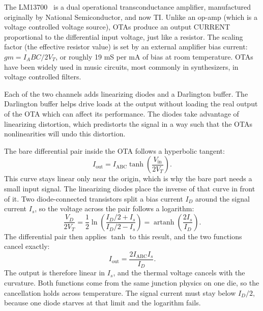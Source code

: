 \documentclass[11pt, letterpaper,titlepage]{article}
\begin{document}
\label{sssec:vcr}

The LM13700~\cite{lm13700} is a dual operational transconductance amplifier, manufactured originally by National Semiconductor, and now TI. Unlike an op-amp (which is a voltage controlled voltage source), OTAs produce an output CURRENT proportional to the differential input voltage, just like a resistor. The scaling factor (the effective resistor value) is set by an external amplifier bias current: $gm = I_ABC / 2V_T$, or roughly 19 mS per mA of bias at room temperature. OTAs have been widely used in music circuits, most commonly in synthesizers, in voltage controlled filters.

Each of the two channels adds linearizing diodes and a Darlington buffer. The Darlington buffer helps drive loads at the output without loading the real output of the OTA which can affect its performance. The
diodes take advantage of linearizing distortion, which predistorts the signal in a way such that the OTAs nonlinearities will undo this distortion.

The bare differential pair inside the OTA follows a hyperbolic tangent:
%
\begin{equation}
    I_\mathrm{out} = I_\mathrm{ABC} \tanh\!\left( \frac{V_\mathrm{in}}{2 V_T} \right) .
    \label{eq:ota-tanh}
\end{equation}
%
This curve stays linear only near the origin, which is why the bare part needs a
small input signal. The linearizing diodes place the inverse of that curve in
front of it. Two diode-connected transistors split a bias current $I_D$ around
the signal current $I_s$, so the voltage across the pair follows a logarithm:
%
\begin{equation}
    \frac{V_D}{2 V_T}
    = \frac{1}{2} \ln\!\left( \frac{I_D/2 + I_s}{I_D/2 - I_s} \right)
    = \operatorname{artanh}\!\left( \frac{2 I_s}{I_D} \right) .
    \label{eq:ota-diode}
\end{equation}
%
The differential pair then applies $\tanh$ to this result, and the two functions
cancel exactly:
%
\begin{equation}
    I_\mathrm{out} = \frac{2 I_\mathrm{ABC} I_s}{I_D} .
    \label{eq:ota-linear}
\end{equation}
%
The output is therefore linear in $I_s$, and the thermal voltage cancels with
the curvature. Both functions come from the same junction physics on one die, so
the cancellation holds across temperature. The signal current must stay below
$I_D/2$, because one diode starves at that limit and the logarithm fails.
\end{document}
